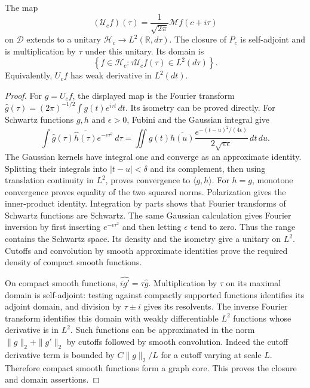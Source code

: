\begin{lemma}
\label{v4-arith:mo:mellin-unitary}
The map
\[
 (\mathcal U_cf)(\tau)=\frac1{\sqrt{2\pi}}
                          \mathcal Mf(c+i\tau)
\]
on $\mathscr D$ extends to a unitary
$\mathscr H_c\to L^2(\mathbb R,d\tau)$. The closure of $P_c$ is
self-adjoint and is multiplication by $\tau$ under this unitary.
Its domain is
\[
 \left\{f\in\mathscr H_c:
       \tau\mathcal U_cf(\tau)\in L^2(d\tau)\right\}.
\]
Equivalently, $U_cf$ has weak derivative in $L^2(dt)$.
\end{lemma}
\begin{proof}
For $g=U_cf$, the displayed map is the Fourier transform
$\widehat g(\tau)=(2\pi)^{-1/2}\int g(t)e^{i\tau t}\,dt$.
Its isometry can be proved directly. For Schwartz functions
$g,h$ and $\epsilon>0$, Fubini and the Gaussian integral give
\[
 \int\widehat g(\tau)\overline{\widehat h(\tau)}
                      e^{-\epsilon\tau^2}\,d\tau
 =\iint g(t)\overline{h(u)}
 \frac{e^{-(t-u)^2/(4\epsilon)}}{2\sqrt{\pi\epsilon}}\,dt\,du.
\]
The Gaussian kernels have integral one and converge as an
approximate identity. Splitting their integrals into
$|t-u|<\delta$ and its complement, then using translation
continuity in $L^2$, proves convergence to $\langle g,h\rangle$.
For $h=g$, monotone convergence proves equality of the two squared
norms. Polarization gives the inner-product identity.
Integration by parts shows that Fourier transforms of Schwartz
functions are Schwartz. The same Gaussian calculation gives
Fourier inversion by first inserting $e^{-\epsilon\tau^2}$ and
then letting $\epsilon$ tend to zero. Thus the range contains the
Schwartz space. Its density and the isometry give a unitary on
$L^2$. Cutoffs and convolution by smooth approximate identities
prove the required density of compact smooth functions.

On compact smooth functions, $\widehat{ig'}=\tau\widehat g$.
Multiplication by $\tau$ on its maximal domain is self-adjoint:
testing against compactly supported functions identifies its
adjoint domain, and division by $\tau\pm i$ gives its resolvents.
The inverse Fourier transform identifies this domain with weakly
differentiable $L^2$ functions whose derivative is in $L^2$.
Such functions can be approximated in the norm
$\|g\|_2+\|g'\|_2$ by cutoffs followed by smooth convolution.
Indeed the cutoff derivative term is bounded by
$C\|g\|_2/L$ for a cutoff varying at scale $L$.
Therefore compact smooth functions form a graph core. This proves
the closure and domain assertions.
\end{proof}

